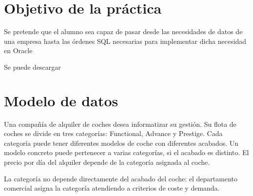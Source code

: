 
\usepackage{eurosym}

\newcommand{\anio}{2017}



\renewcommand{\hmwkTitle}{Diseño E/R, paso a SQL e inserción de datos}
\renewcommand{\hmwkClass}{Gestión de Bases de Datos}

\usepackage{enumitem}%






\primerapagina


\section{Objetivo de la práctica}
Se pretende que el alumno sea capaz de pasar desde las necesidades de datos de una empresa hasta las órdenes SQL necesarias para implementar dicha necesidad en Oracle

Se puede descargar 

\section{Modelo de datos}
Una compañía de alquiler de coches desea informatizar su gestión.  Su flota de coches se divide en tres categorías: Functional, Advance y Prestige. Cada categoría puede tener diferentes modelos de coche con diferentes acabados. Un modelo concreto puede pertenecer a varias categorías, si el acabado es distinto. El precio por día del alquiler depende de la categoría asignada al coche.

La categoría no depende directamente del acabado del coche: el departamento comercial asigna la categoría atendiendo a criterios de coste y demanda.

